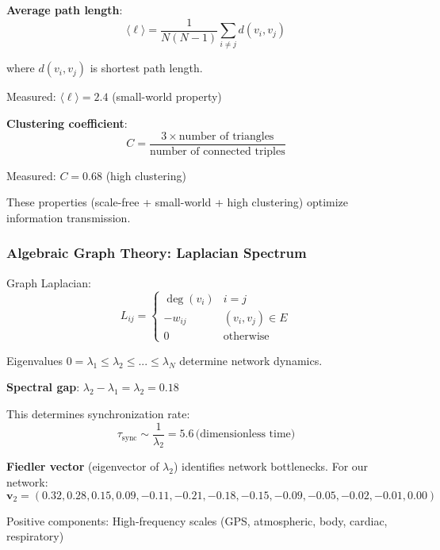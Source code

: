 \documentclass[11pt,onecolumn]{article}
\begin{document}
\textbf{Average path length}:
\begin{equation}
\langle \ell \rangle = \frac{1}{N(N-1)}\sum_{i \neq j} d(v_i, v_j)
\end{equation}

where $d(v_i, v_j)$ is shortest path length.

Measured: $\langle \ell \rangle = 2.4$ (small-world property)

\textbf{Clustering coefficient}:
\begin{equation}
C = \frac{3 \times \text{number of triangles}}{\text{number of connected triples}}
\end{equation}

Measured: $C = 0.68$ (high clustering)

These properties (scale-free + small-world + high clustering) optimize information transmission.

\subsubsection{Algebraic Graph Theory: Laplacian Spectrum}

Graph Laplacian:
\begin{equation}
L_{ij} = \begin{cases}
\deg(v_i) & i = j \\
-w_{ij} & (v_i, v_j) \in E \\
0 & \text{otherwise}
\end{cases}
\end{equation}

Eigenvalues $0 = \lambda_1 \leq \lambda_2 \leq ... \leq \lambda_N$ determine network dynamics.

\textbf{Spectral gap}: $\lambda_2 - \lambda_1 = \lambda_2 = 0.18$

This determines synchronization rate:
\begin{equation}
\tau_{\text{sync}} \sim \frac{1}{\lambda_2} = 5.6\,\text{(dimensionless time)}
\end{equation}

\textbf{Fiedler vector} (eigenvector of $\lambda_2$) identifies network bottlenecks. For our network:
\begin{equation}
\mathbf{v}_2 = (0.32, 0.28, 0.15, 0.09, -0.11, -0.21, -0.18, -0.15, -0.09, -0.05, -0.02, -0.01, 0.00)
\end{equation}

Positive components: High-frequency scales (GPS, atmospheric, body, cardiac, respiratory)
\end{document}
